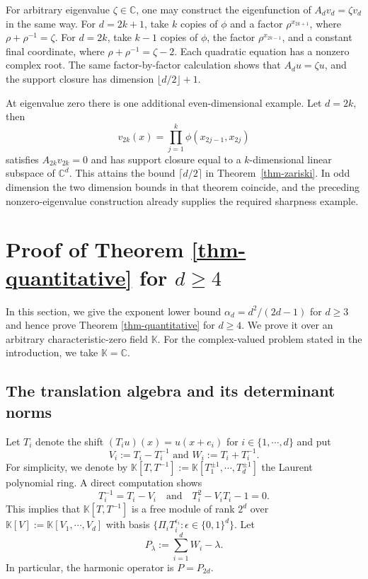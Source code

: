 \documentclass[11pt,reqno]{amsart}
\newcommand\K{\ensuremath{\mathbb{K}}}
\newcommand\C{\ensuremath{\mathbb{C}}}
\theoremstyle{definition}
\theoremstyle{plain}
\numberwithin{equation}{section}
\begin{document}
For arbitrary eigenvalue $\zeta\in \C$, one may construct the eigenfunction of $A_d v_d=\zeta v_d$ in the same way. For $d=2k+1$, take $k$ copies of $\phi$
and a factor $\rho^{x_{2k+1}}$, where
$\rho+\rho^{-1}=\zeta$. For $d=2k$, take $k-1$ copies of $\phi$, the
factor $\rho^{x_{2k-1}}$, and a constant final coordinate, where
$\rho+\rho^{-1}=\zeta-2$. Each quadratic equation
has a nonzero complex root. The same factor-by-factor calculation shows that $A_du=\zeta u$,
and the support closure has dimension $\lfloor d/2\rfloor+1$.

At eigenvalue zero there is one additional even-dimensional example. Let
$d=2k$, then
\begin{equation*}
 v_{2k}(x)=\prod_{j=1}^k\phi(x_{2j-1},x_{2j})
\end{equation*}
satisfies $A_{2k}v_{2k}=0$ and has support closure equal to a $k$-dimensional linear subspace of $\C^d$.
This attains the bound $\lceil d/2\rceil$ in
Theorem~\ref{thm-zariski}. In odd dimension the two dimension bounds in
that theorem coincide, and the preceding nonzero-eigenvalue construction
already supplies the required sharpness example.





\section{Proof of Theorem \ref{thm-quantitative} for \texorpdfstring{$d\ge 4$}{}}\label{sec:proof-any-d}

In this section, we give the exponent lower bound $\alpha_d=d^2/(2d-1)$ for $d\ge 3$ and hence prove Theorem \ref{thm-quantitative} for $d\ge 4$. We prove it over an arbitrary characteristic-zero field $\K$. For the complex-valued problem stated in the introduction, we take $\K=\C$.

\subsection{The translation algebra and its determinant norms}

Let $T_i$ denote the shift $(T_iu)(x)=u(x+e_i)$ for $i\in \lbrace 1,\cdots,d \rbrace$ and put
\begin{equation*}
    V_i:=T_i-T_{i}^{-1} \text{ and } W_i:=T_i+T_i^{-1}.
\end{equation*}
For simplicity, we denote by $\K[T,T^{-1}]:=\K[T_1^{\pm 1}, \cdots, T_d^{\pm 1}]$ the Laurent polynomial ring. A direct computation shows
\begin{equation*}
    T_i^{-1}= T_i-V_i \quad \text{and}\quad T_i^2-V_iT_i-1=0.
\end{equation*}
This implies that $\K[T,T^{-1}]$ is a free module of rank $2^d$ over $\K[V]:=\K[V_1,\cdots,V_d]$ with basis $\lbrace \Pi_iT_i^{\epsilon_i}:\epsilon\in \lbrace 0,1\rbrace^d\rbrace$. Let
\begin{equation*}
    P_\lambda:=\sum_{i=1}^d W_i-\lambda.
\end{equation*}
In particular, the harmonic operator is $P=P_{2d}$.
\end{document}
